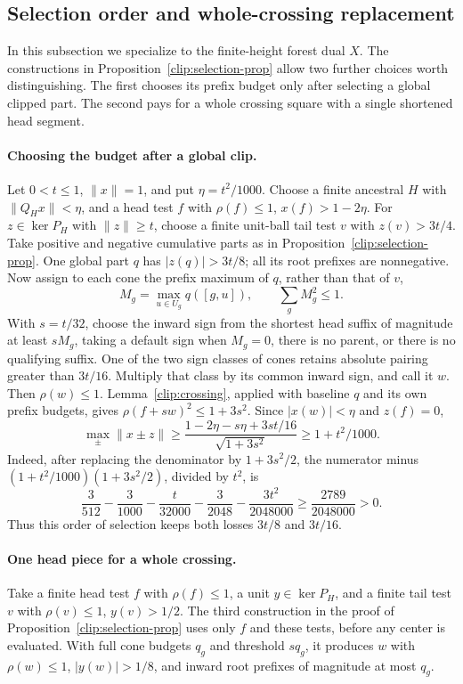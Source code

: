\subsection{Selection order and whole-crossing replacement}
\label{dir:primal:add:selection}
In this subsection we specialize to the finite-height forest dual $X$.
The constructions in Proposition~\ref{clip:selection-prop} allow two
further choices worth distinguishing. The first chooses its prefix budget
only after selecting a global clipped part. The second pays for a whole
crossing square with a single shortened head segment.

\paragraph{Choosing the budget after a global clip.}
\label{dir:primal:add:global}
Let \(0<t\le1\), \(\|x\|=1\), and put \(\eta=t^2/1000\).
Choose a finite ancestral \(H\) with \(\|Q_Hx\|<\eta\), and a head test
\(f\) with \(\rho(f)\le1\), \(x(f)>1-2\eta\).
For \(z\in\ker P_H\) with \(\|z\|\ge t\), choose a finite unit-ball
tail test \(v\) with \(z(v)>3t/4\).
Take positive and negative cumulative parts as in
Proposition~\ref{clip:selection-prop}. One global part \(q\) has
\(|z(q)|>3t/8\); all its root prefixes are nonnegative. Now assign to
each cone the prefix maximum of \(q\), rather than that of \(v\),
\[
 M_g=\max_{u\in U_g}q([g,u]),\qquad \sum_gM_g^2\le1.
\]
With \(s=t/32\), choose the inward sign from the shortest head suffix
of magnitude at least \(sM_g\), taking a default sign when \(M_g=0\),
there is no parent, or there is no qualifying suffix.
One of the two sign classes of cones retains absolute pairing greater
than \(3t/16\). Multiply that class by its common inward sign, and call
it \(w\). Then \(\rho(w)\le1\). Lemma~\ref{clip:crossing}, applied with
baseline \(q\) and its own prefix budgets, gives
\(\rho(f+sw)^2\le1+3s^2\). Since \(|x(w)|<\eta\) and \(z(f)=0\),
\begin{equation}\label{dir:primal:add:global-gain}
 \max_{\pm}\|x\pm z\|
 \ge\frac{1-2\eta-s\eta+3st/16}{\sqrt{1+3s^2}}
 \ge1+t^2/1000.
\end{equation}
Indeed, after replacing the denominator by \(1+3s^2/2\), the numerator
minus \((1+t^2/1000)(1+3s^2/2)\), divided by \(t^2\), is
\[
 \frac3{512}-\frac3{1000}-\frac t{32000}
 -\frac3{2048}-\frac{3t^2}{2048000}
 \ge\frac{2789}{2048000}>0.
\]
Thus this order of selection keeps both losses \(3t/8\) and \(3t/16\).

\paragraph{One head piece for a whole crossing.}
\label{dir:primal:add:whole-crossing}
Take a finite head test \(f\) with \(\rho(f)\le1\), a unit
\(y\in\ker P_H\), and a finite tail test \(v\) with
\(\rho(v)\le1\), \(y(v)>1/2\).
The third construction in the proof of Proposition~\ref{clip:selection-prop}
uses only \(f\) and these tests, before any center is evaluated. With full
cone budgets \(q_g\) and threshold \(s q_g\), it produces \(w\) with
\(\rho(w)\le1\), \(|y(w)|>1/8\), and inward root prefixes of magnitude
at most \(q_g\).

